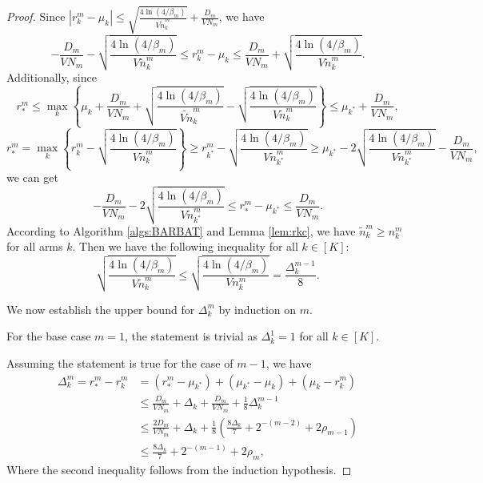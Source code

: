 \begin{proof}
    Since $|r_k^m - \mu_k| \leq \sqrt{\frac{4\ln(4 /\beta_m)}{V\widetilde{n}_k^m}} + \frac{D_m}{VN_m}$, we have
    \[-\frac{D_m}{VN_m} - \sqrt{\frac{4\ln(4 /\beta_m)}{V\widetilde{n}_k^m}} \leq r_{k}^m - \mu_{k} \leq \frac{D_m}{VN_m} + \sqrt{\frac{4\ln(4 /\beta_m)}{V\widetilde{n}_k^m}}.\]
    Additionally, since
    \[r_{*}^m \leq \max_k \left\{\mu_{k} + \frac{D_m}{VN_m} + \sqrt{\frac{4\ln(4 /\beta_m)}{\widetilde{Vn}_k^m}} - \sqrt{\frac{4\ln(4 /\beta_m)}{V\widetilde{n}_k^m}}\right\} \leq \mu_{k^*} + \frac{D_m}{VN_m},\]
    \[r_{*}^m = \max_k \left\{r_k^m - \sqrt{\frac{4\ln(4 /\beta_m)}{V\widetilde{n}_k^m}}\right\} \geq r_{k^*}^m - \sqrt{\frac{4\ln(4 /\beta_m)}{V\widetilde{n}_{k^*}^m}} \geq \mu_{k^*} - 2\sqrt{\frac{4\ln(4 /\beta_m)}{V\widetilde{n}_{k^*}^m}} - \frac{D_m}{VN_m},\]
    we can get
    \[-\frac{D_m}{VN_m} - 2\sqrt{\frac{4\ln(4 /\beta_m)}{V\widetilde{n}_{k^*}^m}} \leq r_{*}^m - \mu_{k^*} \leq \frac{D_m}{VN_m}.\]
    According to Algorithm \ref{algs:BARBAT} and Lemma \ref{lem:rkc}, we have $\widetilde{n}_k^m \geq n_k^m$ for all arms $k$. Then we have the following inequality for all $k\in [K]$:
    \[\sqrt{\frac{4\ln(4 /\beta_m)}{V\widetilde{n}_k^m}} \leq \sqrt{\frac{4\ln(4 /\beta_m)}{Vn_k^m}} = \frac{\Delta_k^{m-1}}{8}.\]

    We now establish the upper bound for $\Delta_k^m$ by induction on $m$.
    
    For the base case $m = 1$, the statement is trivial as $\Delta_k^1 = 1$ for all $k \in [K]$.
    
    Assuming the statement is true for the case of $m-1$, we have
    \begin{equation*}
    \begin{split}
        \Delta_k^m = r_*^m - r_k^m
        &= (r_*^m - \mu_{k^*}) + (\mu_{k^*} - \mu_k) + (\mu_k - r_k^m) \\
        &\leq \frac{D_m}{VN_m}+ \Delta_k + \frac{D_m}{VN_m} + \frac{1}{8}\Delta_k^{m-1} \\
        &\leq \frac{2D_m}{VN_m} + \Delta_k + \frac{1}{8}\left(\frac{8 \Delta_k}{7} + 2^{-(m-2)} + 2\rho_{m-1}\right) \\
        &\leq \frac{8 \Delta_k}{7} + 2^{-(m-1)} + 2\rho_m,
    \end{split}
    \end{equation*}
    Where the second inequality follows from the induction hypothesis.
     

\end{proof}
